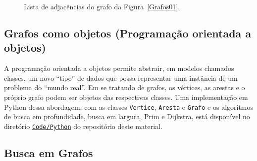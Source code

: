 \documentclass[11pt,fleqn]{book} %
\begin{document}
\def\LinkedList#1{%
  \foreach \element in \list {
     \node[node of list, right = of aux, name=ele] {\element};
     \draw[link] (aux) -- (ele);
     \coordinate (aux) at (ele.east);
  } 
}
\begin{figure}
\centering
{}
\caption{Lista de adjacências do grafo da Figura~\ref{Grafos01}.}
\label{Grafos_Lista_Adjacencia}
\end{figure}

\subsection{Grafos como objetos (Programação orientada a objetos)}

A programação orientada a objetos permite abstrair, em modelos chamados classes, um novo ``tipo'' de dados que possa representar uma instância de um problema do ``mundo real''. Em se tratando de grafos, os vértices, as arestas e o próprio grafo podem ser objetos das respectivas classes.
Uma implementação em Python dessa abordagem, com as classes \texttt{Vertice}, \texttt{Aresta} e \texttt{Grafo} e os algoritmos de busca em profundidade, busca em largura, Prim e Dijkstra, está disponível no diretório \href{https://github.com/giiff/livro_algoritmos_e_estruturas_de_dados/tree/master/Code/Python}{\texttt{Code/Python}} do repositório deste material.

\subsection{Busca em Grafos}
\indent
\end{document}
